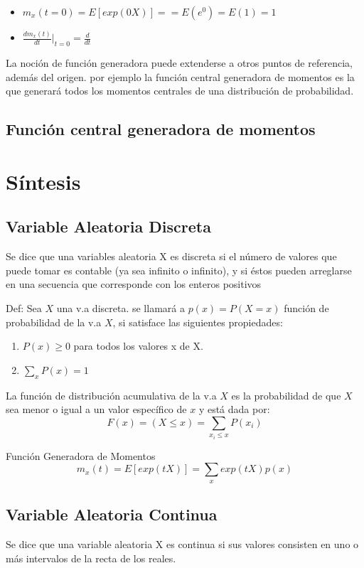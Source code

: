 \documentclass{book}
\begin{document}
\begin{itemize}
    \item $m_x(t=0) = E[exp(0X)]= = E(e^0) = E(1)=1$
    \item $\frac{dm_x(t)}{dt}|_{t=0} = \frac{d}{dt}$
\end{itemize}

La noción de función generadora puede extenderse a otros puntos de referencia, además del origen. por ejemplo la función central generadora de momentos es la que generará todos los momentos centrales de una distribución de probabilidad.

\subsection{Función central generadora de momentos}

\section{Síntesis}
\subsection{Variable Aleatoria Discreta} Se dice que una variables aleatoria X es discreta si el número de valores que puede tomar es contable (ya sea infinito o infinito), y si éstos pueden arreglarse en una secuencia que corresponde con los enteros positivos

Def: Sea $X$ una v.a discreta. se llamará a $p(x)=P(X=x)$ función de probabilidad de la v.a $X$, si satisface las siguientes propiedades:

\begin{enumerate}
    \item $P(x)\geq 0$ para todos los valores x de X.
    \item $\underset{x}{\sum}P(x)=1$
\end{enumerate}


La función de distribución acumulativa de la v.a $X$ es la probabilidad de que $X$ sea menor o igual a un valor específico de $x$ y está dada por: $$F(x)=(X\leq x)=\underset{x_i \leq x}{\sum} P(x_i)$$

Función Generadora de Momentos
$$m_x(t)=E[exp(tX)]=\underset{x}{\sum}exp(tX)p(x)$$


\subsection{Variable Aleatoria Continua} Se dice que una variable aleatoria X es continua si sus valores consisten en uno o más intervalos de la recta de los reales. 
\end{document}
